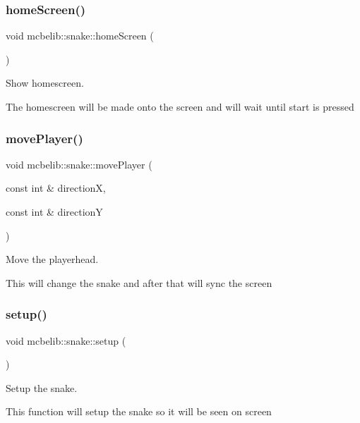 \subsubsection{\texorpdfstring{home\+Screen()}{homeScreen()}}
{\footnotesize\ttfamily void mcbelib\+::snake\+::home\+Screen (\begin{DoxyParamCaption}{ }\end{DoxyParamCaption})}



Show homescreen. 

The homescreen will be made onto the screen and will wait until start is pressed \mbox{\label{classmcbelib_1_1snake_afdeaee89ca2cfeefc60db77b3101ccf0}} 
\subsubsection{\texorpdfstring{move\+Player()}{movePlayer()}}
{\footnotesize\ttfamily void mcbelib\+::snake\+::move\+Player (\begin{DoxyParamCaption}\item[{const int \&}]{directionX,  }\item[{const int \&}]{directionY }\end{DoxyParamCaption})}



Move the playerhead. 

This will change the snake and after that will sync the screen \mbox{\label{classmcbelib_1_1snake_af3720fcb7cf33fd3e362815824f854ee}} 
\subsubsection{\texorpdfstring{setup()}{setup()}}
{\footnotesize\ttfamily void mcbelib\+::snake\+::setup (\begin{DoxyParamCaption}{ }\end{DoxyParamCaption})}



Setup the snake. 

This function will setup the snake so it will be seen on screen \mbox{\label{classmcbelib_1_1snake_aae04f6565a52ea47decf35f41b7b53b4}} 
